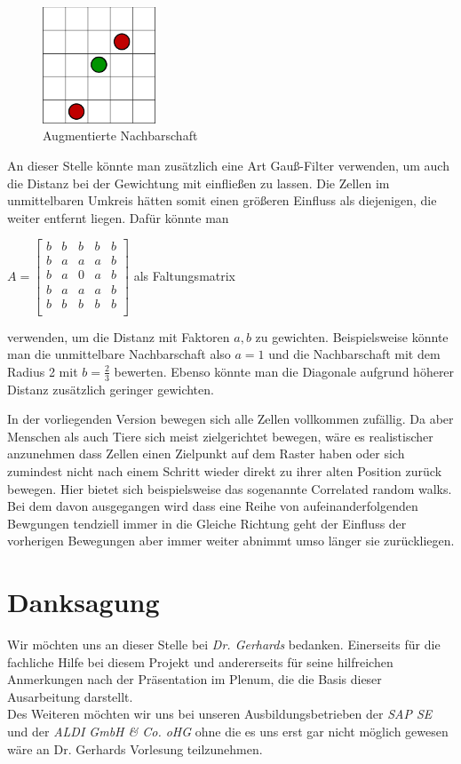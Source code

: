 \documentclass[10pt,twocolumn]{scrartcl}
\begin{document}
\begin{figure}[H]
	\centering
	\includegraphics[width= 0.3\textwidth]{./images/ewNachbar.pdf}
	\caption{Augmentierte Nachbarschaft}
	\label{fig:ewnachbar}
\end{figure}
An dieser Stelle könnte man zusätzlich eine Art Gauß-Filter verwenden, um auch die Distanz bei der Gewichtung mit einfließen zu lassen. Die Zellen im unmittelbaren Umkreis hätten somit einen größeren Einfluss als diejenigen, die weiter entfernt liegen.
Dafür könnte man 
\begin{center}
 $A = 
\begin{bmatrix}
b & b & b & b & b \\
b & a & a & a & b \\
b & a & 0 & a & b \\
b & a & a & a & b \\
b & b & b & b & b \\
\end{bmatrix}
$ als Faltungsmatrix
\end{center} verwenden, um die Distanz mit Faktoren $a,b$ zu gewichten. Beispielsweise könnte man die unmittelbare Nachbarschaft also $a=1$ und die Nachbarschaft mit dem Radius 2 mit $b=\frac{2}{3}$ bewerten. Ebenso könnte man die Diagonale aufgrund höherer Distanz zusätzlich geringer gewichten.

In der vorliegenden Version bewegen sich alle Zellen vollkommen zufällig. Da aber Menschen als auch Tiere sich meist zielgerichtet bewegen, wäre es realistischer anzunehmen dass Zellen einen Zielpunkt auf dem Raster haben oder sich zumindest nicht nach einem Schritt wieder direkt zu ihrer alten Position zurück bewegen. Hier bietet sich beispielsweise das sogenannte \glqq{}Correlated random walks\grqq{}. Bei dem davon ausgegangen wird dass eine Reihe von aufeinanderfolgenden Bewgungen tendziell immer in die Gleiche Richtung geht der Einfluss der vorherigen Bewegungen aber immer weiter abnimmt umso länger sie zurückliegen\cite{Codling:2008}.



\section*{Danksagung}
Wir möchten uns an dieser Stelle bei \emph{Dr. Gerhards} bedanken. Einerseits für die fachliche Hilfe bei diesem Projekt und andererseits für seine hilfreichen Anmerkungen nach der Präsentation im Plenum, die die Basis dieser Ausarbeitung darstellt.\\
Des Weiteren möchten wir uns bei unseren Ausbildungsbetrieben der \emph{SAP SE} und der \emph{ALDI GmbH \& Co. oHG} ohne die es uns erst gar nicht möglich gewesen wäre an Dr. Gerhards Vorlesung teilzunehmen.
\end{document}
